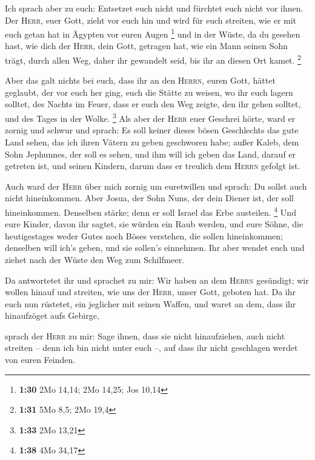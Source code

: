  Ich sprach aber zu euch: Entsetzet euch nicht und
fürchtet euch nicht vor ihnen.  Der \textsc{Herr}, euer
Gott, zieht vor euch hin und wird für euch streiten, wie er mit euch
getan hat in Ägypten vor euren Augen \footnote{\textbf{1:30} 2Mo 14,14;
  2Mo 14,25; Jos 10,14}  und in der Wüste, da du gesehen
hast, wie dich der \textsc{Herr}, dein Gott, getragen hat, wie ein Mann
seinen Sohn trägt, durch allen Weg, daher ihr gewandelt seid, bis ihr an
diesen Ort kamet. \footnote{\textbf{1:31} 5Mo 8,5; 2Mo 19,4}

 Aber das galt nichts bei euch, dass ihr an den
\textsc{Herrn}, euren Gott, hättet geglaubt,  der vor
euch her ging, euch die Stätte zu weisen, wo ihr euch lagern solltet,
des Nachts im Feuer, dass er euch den Weg zeigte, den ihr gehen solltet,
und des Tages in der Wolke. \footnote{\textbf{1:33} 2Mo 13,21}
 Als aber der \textsc{Herr} euer Geschrei hörte, ward er
zornig und schwur und sprach:  Es soll keiner dieses
bösen Geschlechts das gute Land sehen, das ich ihren Vätern zu geben
geschworen habe;  außer Kaleb, dem Sohn Jephunnes, der
soll es sehen, und ihm will ich geben das Land, darauf er getreten ist,
und seinen Kindern, darum dass er treulich dem \textsc{Herrn} gefolgt
ist.

 Auch ward der \textsc{Herr} über mich zornig um
euretwillen und sprach: Du sollst auch nicht hineinkommen.
 Aber Josua, der Sohn Nuns, der dein Diener ist, der soll
hineinkommen. Denselben stärke; denn er soll Israel das Erbe austeilen.
\footnote{\textbf{1:38} 4Mo 34,17}  Und eure Kinder,
davon ihr sagtet, sie würden ein Raub werden, und eure Söhne, die
heutigestages weder Gutes noch Böses verstehen, die sollen hineinkommen;
denselben will ich's geben, und sie sollen's einnehmen. 
Ihr aber wendet euch und ziehet nach der Wüste den Weg zum Schilfmeer.

 Da antwortetet ihr und sprachet zu mir: Wir haben an dem
\textsc{Herrn} gesündigt; wir wollen hinauf und streiten, wie uns der
\textsc{Herr}, unser Gott, geboten hat. Da ihr euch nun rüstetet, ein
jeglicher mit seinen Waffen, und waret an dem, dass ihr hinaufzöget aufs
Gebirge,

 sprach der \textsc{Herr} zu mir: Sage ihnen, dass sie
nicht hinaufziehen, auch nicht streiten -- denn ich bin nicht unter euch
--, auf dass ihr nicht geschlagen werdet von euren Feinden.

